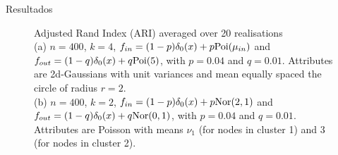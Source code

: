 \documentclass[aspectratio=169]{beamer}
\begin{document}
\begin{frame}{Resultados}
\begin{figure}[!ht]
\begin{subfigure}[b]{0.3\textwidth}
			\label{fig:varying_divergences_attributes}
		\end{subfigure}
		\caption{Adjusted Rand Index (ARI) averaged over 20 realisations \\
			(a) $n=400$, $k=4$, $f_{in} = (1-p)\delta_0(x) + p \mathrm{Poi}(\mu_{in})$ and $f_{out} = (1-q) \delta_0(x) + q \mathrm{Poi}(5)$, with $p=0.04$ and $q=0.01$. Attributes are 2d-Gaussians with unit variances and mean equally spaced the circle of radius $r=2$. \\ 
			(b) $n=400$, $k=2$, $f_{in} = (1-p)\delta_0(x) + p \mathrm{Nor}(2,1)$ and $f_{out} = (1-q) \delta_0(x) + q \mathrm{Nor}(0,1)$, with $p=0.04$ and $q=0.01$. Attributes are Poisson with means $\nu_1$ (for nodes in cluster 1) and $3$ (for nodes in cluster 2). 
		}
		\label{fig:varying_divergences}
	\end{figure}
\end{frame}
\end{document}
